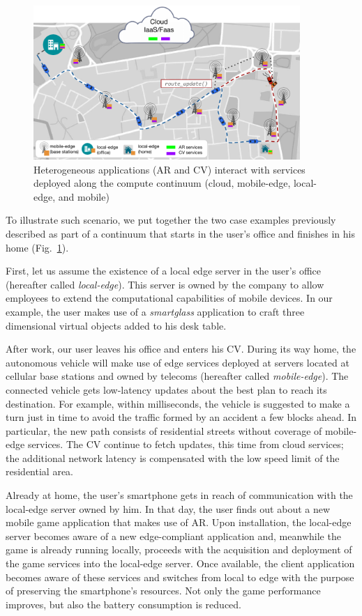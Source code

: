 \begin{figure}[tbp]
	\includegraphics[width=0.9\textwidth]{figs/Continuum-Scenario}
	\caption{Heterogeneous applications (AR and CV) interact with services deployed along the compute continuum (cloud, mobile-edge, local-edge, and mobile)}
	\label{fig:continuum-scenario}
\end{figure}


To illustrate such scenario, we put together the two case examples previously described as part of a continuum that starts in the user's office and finishes in his home (Fig.~\ref{fig:continuum-scenario}). 

First, let us assume the existence of a local edge server in the user's office (hereafter called \textit{local-edge}). This server is owned by the company to allow employees to extend the computational capabilities of mobile devices. In our example, the user makes use of a \textit{smartglass} application to craft three dimensional virtual objects added to his desk table.

After work, our user leaves his office and enters his CV. During its way home, the autonomous vehicle will make use of edge services deployed at servers located at cellular base stations and owned by telecoms (hereafter called \textit{mobile-edge}). The connected vehicle gets low-latency updates about the best plan to reach its destination. For example, within milliseconds, the vehicle is suggested to make a turn just in time to avoid the traffic formed by an accident a few blocks ahead. In particular, the new path consists of residential streets without coverage of mobile-edge services. The CV continue to fetch updates, this time from cloud services; the additional network latency is compensated with the low speed limit of the residential area.

Already at home, the user's smartphone gets in reach of communication with the local-edge server owned by him. In that day, the user finds out about a new mobile game application that makes use of AR. Upon installation, the local-edge server becomes aware of a new edge-compliant application and, meanwhile the game is already running locally, proceeds with the acquisition and deployment of the game services into the local-edge server. Once available, the client application becomes aware of these services and switches from local to edge with the purpose of preserving the smartphone's resources. Not only the game performance improves, but also the battery consumption is reduced.  

